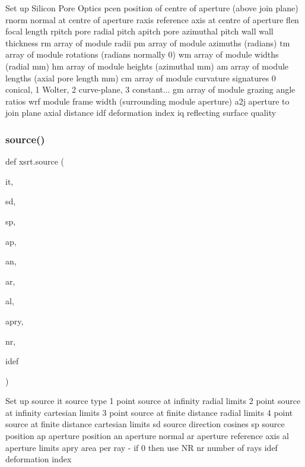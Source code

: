 \begin{DoxyVerb}Set up Silicon Pore Optics
    pcen       position of centre of aperture (above join plane)
    rnorm      normal at centre of aperture
    raxis      reference axis at centre of aperture
    flen       focal length
    rpitch     pore radial pitch
    apitch     pore azimuthal pitch
    wall       wall thickness
    rm         array of module radii
    pm         array of module azimuths (radians)
    tm         array of module rotations (radians normally 0)
    wm         array of module widths (radial mm)
    hm         array of module heights (azimuthal mm)
    am         array of module lengths (axial pore length mm)
    cm         array of module curvature signatures
               0 conical, 1 Wolter, 2 curve-plane, 3 constant...
    gm         array of module grazing angle ratios
    wrf        module frame width (surrounding module aperture)
    a2j        aperture to join plane axial distance
    idf        deformation index
    iq         reflecting surface quality
\end{DoxyVerb}
 \mbox{\label{namespacexsrt_af8d7e5e8e371b498b9f3ccb322ac257a}} 
\subsubsection{\texorpdfstring{source()}{source()}}
{\footnotesize\ttfamily def xsrt.\+source (\begin{DoxyParamCaption}\item[{}]{it,  }\item[{}]{sd,  }\item[{}]{sp,  }\item[{}]{ap,  }\item[{}]{an,  }\item[{}]{ar,  }\item[{}]{al,  }\item[{}]{apry,  }\item[{}]{nr,  }\item[{}]{idef }\end{DoxyParamCaption})}

\begin{DoxyVerb}Set up source 
    it         source type 
                1 point source at infinity               radial limits
                2 point source at infinity               cartesian limits
                3 point source at finite distance        radial limits
                4 point source at finite distance        cartesian limits
    sd         source direction cosines
    sp         source position
    ap         aperture position
    an         aperture normal
    ar         aperture reference axis
    al         aperture limits
    apry       area per ray - if 0 then use NR
    nr         number of rays
    idef       deformation index
\end{DoxyVerb}
 \mbox{\label{namespacexsrt_a684bb54f6df516f3dce0f3517bd3667b}} 
